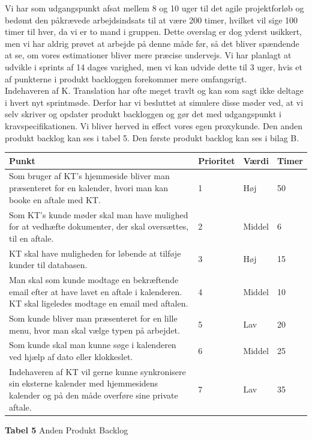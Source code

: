 \documentclass[12pt]{article}   %
\begin{document}
Vi har som udgangspunkt afsat mellem 8 og 10 uger til det agile projektforløb og bedømt den påkrævede arbejdsindsats til at være 200 timer, hvilket vil sige 100
timer til hver, da vi er to mand i gruppen. Dette overslag er dog yderst usikkert, men vi har aldrig prøvet at arbejde på denne måde før, så det bliver spændende at se, om vores estimationer bliver mere præcise undervejs. Vi har
planlagt at udvikle i sprints af 14 dages varighed, men vi kan udvide dette til 3 uger, hvis et af punkterne i produkt backloggen forekommer mere omfangsrigt.\\
Indehaveren af K. Translation har ofte meget travlt og kan som sagt ikke deltage i hvert nyt sprintmøde. Derfor har vi besluttet at simulere disse møder ved, at vi selv skriver og opdater produkt backloggen og gør det med udgangspunkt i kravspecifikationen. Vi bliver herved in effect vores egen 
proxykunde. Den anden produkt backlog kan ses i tabel 5. Den første produkt backlog kan ses i bilag B.

\begin{center}
	\begin{tabular}{|p{8cm}|l|l|l|}
		\hline
Punkt & Prioritet & Værdi & Timer \\ \hline
Som bruger af KT's hjemmeside bliver man præsenteret for en kalender, hvori man
kan booke en aftale med KT. & 1 & Høj &  50 \\ \hline
Som KT's kunde møder skal man have mulighed for at vedhæfte dokumenter, der skal oversættes, til en aftale. & 2 &
Middel & 6  \\ \hline
KT skal have muligheden for løbende at tilføje kunder til databasen. & 3 & Høj
& 15 \\ \hline
Man skal som kunde modtage en bekræftende email efter at have lavet en aftale
i kalenderen. KT skal ligeledes modtage en email med aftalen. & 4 & Middel & 10  \\ \hline
Som kunde bliver man præsenteret for en lille menu, hvor man skal vælge typen
på arbejdet. & 5 & Lav & 20\\ \hline
Som kunde skal man kunne søge i kalenderen ved hjælp af dato eller klokkeslet.
& 6  & Middel &  25 \\ \hline
Indehaveren af KT vil gerne kunne synkronisere sin eksterne kalender med
hjemmesidens kalender og på den måde overføre sine private aftale. & 7 & Lav &
 35 \\ \hline
\end{tabular}
\end{center}
\begin{center}\textbf{Tabel 5} Anden Produkt Backlog
\end{center}
\vspace{0.5cm}
\end{document}
